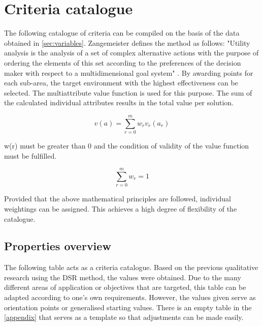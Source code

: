 \documentclass[MIC,Master,english]{twbook}%
\begin{document}
\section{Criteria catalogue}
\label{sec:cc}
The following catalogue of criteria can be compiled on the basis of the data obtained in \autoref{sec:variables}. Zangemeister defines the method as follows: "Utility analysis is the analysis of a set of complex alternative actions with the purpose of ordering the elements of this set according to the preferences of the decision maker with respect to a multidimensional goal system" \cite{nwa}. By awarding points for each sub-area, the target environment with the highest effectiveness can be selected. The multiattribute value function is used for this purpose. The sum of the calculated individual attributes results in the total value per solution.

\begin{equation*}
v(a) = \sum \limits_{r=0}^{m}w_{r} v_{r} (a_{r})
\end{equation*}

w(r) must be greater than 0 and the condition of validity of the value function must be fulfilled.

\begin{equation*}
\sum \limits_{r=0}^{m} w_{r} = 1
\end{equation*}

Provided that the above mathematical principles are followed, individual weightings can be assigned. This achieves a high degree of flexibility of the catalogue. 

\subsection{Properties overview}
The following table acts as a criteria catalogue. Based on the previous qualitative research using the \ac{DSR} method, the values were obtained. Due to the many different areas of application or objectives that are targeted, this table can be adapted according to one's own requirements. However, the values given serve as orientation points or generalised starting values. There is an empty table in the \autoref{appendix} that serves as a template so that adjustments can be made easily.
\end{document}
